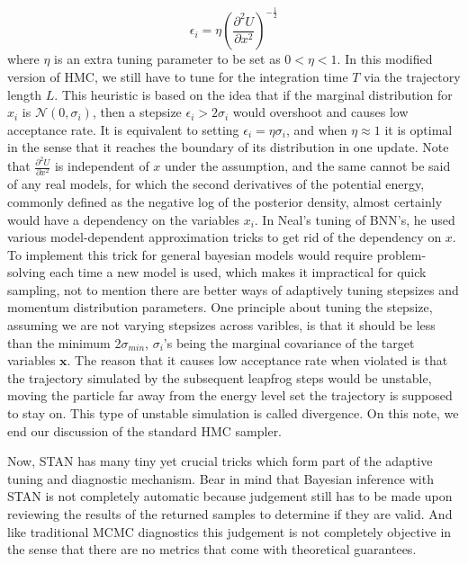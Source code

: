 \documentclass{book}
\begin{document}
\begin{enumerate}
\[ \epsilon_i  = \eta (\frac{\partial^2 U}{\partial x^2})^{-\frac{1}{2}}\]
where $\eta$ is an extra tuning parameter to be set as $0<\eta<1$. In this
modified version of HMC, we still have to tune for the integration time $T$ via
the trajectory length $L$. This heuristic is based on the idea that if the
marginal distribution for $x_i$ is $\mathcal{N}(0,\sigma_i)$, then a
stepsize $\epsilon_i > 2 \sigma_i$ would overshoot and causes low acceptance
rate. It is equivalent to setting $\epsilon_i = \eta \sigma_i$, and when $\eta
\approx 1$ it is optimal in the sense that it reaches the boundary of its
distribution in one update. Note that $  \frac{\partial^2 U}{\partial x^2}$ is
independent of $x$ under the assumption, and the same cannot be said of any real
models, for which the second derivatives of the potential energy, commonly
defined as the negative log of the posterior density, almost certainly would
have a dependency on the variables $x_i$. In Neal's tuning of BNN's, he used
various model-dependent approximation tricks to get rid of the dependency on
$x$. To implement this trick for general bayesian models would require
problem-solving each time a new model is used, which makes it impractical for
quick sampling, not to mention there are better ways of adaptively tuning
stepsizes and momentum distribution parameters. One principle about tuning
the stepsize, assuming we are not varying stepsizes across varibles, is that it
should be less than the minimum 2$\sigma_{min}$, $\sigma_i$'s being the marginal
covariance of the target variables $\mathbf{x}$. The reason that it causes low
acceptance rate when violated is that the trajectory simulated by the subsequent
leapfrog steps would be unstable, moving the particle far away from the energy
level set the trajectory is supposed to stay on. This type of unstable
simulation is called divergence. On this note, we end our discussion of the
standard HMC sampler.

Now, STAN has many tiny yet crucial tricks which form part of the adaptive
tuning and diagnostic mechanism. Bear in mind that Bayesian inference with STAN is not completely
automatic because judgement still has to be made upon reviewing the results of
the returned samples to determine if they are valid. And like traditional MCMC
diagnostics this judgement is not completely objective in the sense that there
are no metrics that come with theoretical guarantees. 


\end{enumerate}
\end{document}
